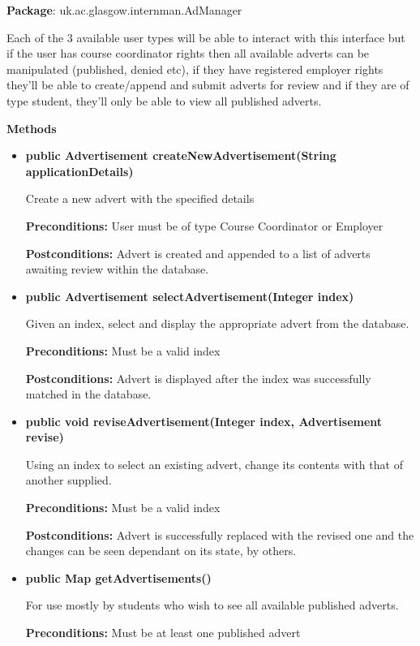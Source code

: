 \documentclass[11pt]{l3deliverable}
\begin{document}
\textbf{Package}: uk.ac.glasgow.internman.AdManager

Each of the 3 available user types will be able to interact with this interface
but if the user has course coordinator rights then all available adverts can be
manipulated (published, denied etc), if they have registered employer rights
they'll be able to create/append and submit adverts for review and if they are
of type student, they'll only be able to view all published adverts.

\textbf{Methods}

\begin{itemize}

\item{\textbf{public Advertisement createNewAdvertisement(String applicationDetails)}

Create a new advert with the specified details

\textbf{Preconditions:} User must be of type Course Coordinator or Employer

\textbf{Postconditions:} Advert is created and appended to a list of adverts awaiting 
review within the database.}

\item{\textbf{public Advertisement selectAdvertisement(Integer index)}

Given an index, select and display the appropriate advert from the database.

\textbf{Preconditions:} Must be a valid index

\textbf{Postconditions:} Advert is displayed after the index was successfully matched
in the database.}

\item{\textbf{public void reviseAdvertisement(Integer index, Advertisement revise)}

Using an index to select an existing advert, change its contents with that of another supplied.

\textbf{Preconditions:} Must be a valid index

\textbf{Postconditions:} Advert is successfully replaced with the revised one and the changes
can be seen dependant on its state, by others.}

\item{\textbf{public Map getAdvertisements()}

For use mostly by students who wish to see all available published adverts.

\textbf{Preconditions:} Must be at least one published advert

}
\end{itemize}
\end{document}
